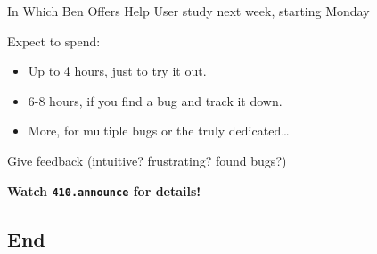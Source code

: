 \documentclass[xcolor=dvipsnames]{beamer}
\begin{document}
\begin{frame}{In Which Ben Offers Help}
	User study next week, starting Monday

	\linegap
	Expect to spend:
	\begin{itemize}
		\item Up to 4 hours, just to try it out.
		\item 6-8 hours, if you find a bug and track it down.
		\item More, for multiple bugs or the truly dedicated\ldots
	\end{itemize}
	\linegap

	Give feedback (intuitive? frustrating? found bugs?)

	\linegap
	{\bf Watch \texttt{410.announce} for details!}
\end{frame}

\subsection{End}



% 
\end{document}
